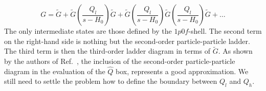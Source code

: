 \begin{equation}
        G=\tilde{G} +\tilde{G}
        \left(\frac{Q_l}{s -H_0}\right)\tilde{G}
        +\tilde{G}
        \left(\frac{Q_l}{s -H_0}\right)\tilde{G}
        \left(\frac{Q_l}{s -H_0}\right)\tilde{G} +\dots
\end{equation}
The only intermediate states are those defined by the $1p0f$-shell.
The second term on the right-hand side is nothing but the second-order 
particle-particle ladder. The third term is then the third-order ladder
diagram in terms of
$\tilde{G}$. As shown by the authors of Ref.~, the inclusion
of the second-order particle-particle diagram in the evaluation
of the $\hat{Q}$ box, represents a good approximation. 
We still need to settle the  problem how to define the boundary between 
$Q_l$ and $Q_h$. 

